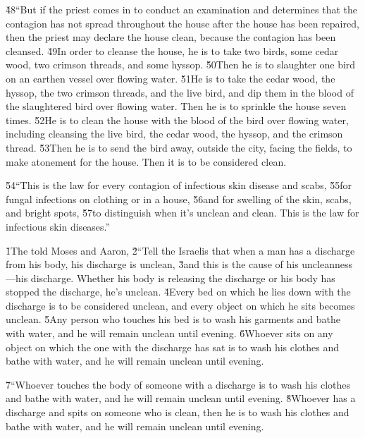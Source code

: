 \v{48}``But if the priest comes in to conduct an examination and determines that the contagion has not spread throughout the house after the house has been repaired, then the priest may declare the house clean, because the contagion has been cleansed. \v{49}In order to cleanse the house, he is to take two birds, some cedar wood, two crimson threads, and some hyssop. \v{50}Then he is to slaughter one bird on an earthen vessel over flowing water. \v{51}He is to take the cedar wood, the hyssop, the two crimson threads, and the live bird, and dip them in the blood of the slaughtered bird over flowing water. Then he is to sprinkle the house seven times. \v{52}He is to clean the house with the blood of the bird over flowing water, including cleansing the live bird, the cedar wood, the hyssop, and the crimson thread. \v{53}Then he is to send the bird away, outside the city, facing the fields, to make atonement for the house. Then it is to be considered clean.

\v{54}``This is the law for every contagion of infectious skin disease and scabs, \v{55}for fungal infections on clothing or in a house, \v{56}and for swelling of the skin, scabs, and bright spots, \v{57}to distinguish when it's unclean and clean. This is the law for infectious skin diseases.''

\v{1}The  told Moses and Aaron, \v{2}``Tell the Israelis that when a man has a discharge from his body, his discharge is unclean, \v{3}and this is the cause of his uncleanness---his discharge. Whether his body is releasing the discharge or his body has stopped the discharge, he's unclean. \v{4}Every bed on which he lies down with the discharge is to be considered unclean, and every object on which he sits becomes unclean. \v{5}Any person who touches his bed is to wash his garments and bathe with water, and he will remain unclean until evening. \v{6}Whoever sits on any object on which the one with the discharge has sat is to wash his clothes and bathe with water, and he will remain unclean until evening.

\v{7}``Whoever touches the body of someone with a discharge is to wash his clothes and bathe with water, and he will remain unclean until evening. \v{8}Whoever has a discharge and spits on someone who is clean, then he is to wash his clothes and bathe with water, and he will remain unclean until evening.

